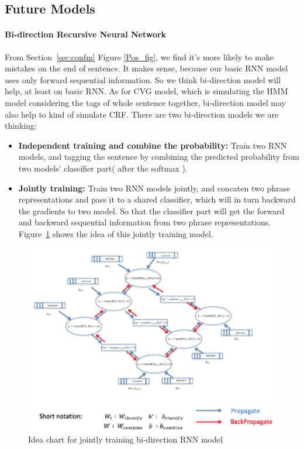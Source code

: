 \documentclass[11pt]{article}
\begin{document}
\subsection{Future Models}

\paragraph{Bi-direction Recursive Neural Network}
From Section~\ref{sec:confm} Figure \ref{Pos_fig}, we find it's more likely to make mistakes on the end of sentence. It makes sense, because our basic RNN model uses only forward sequential information. So we think bi-direction model will help, at least on basic RNN. As for CVG model, which is simulating the HMM model considering the tags of whole sentence together, bi-direction model may also help to kind of simulate CRF. There are two bi-direction models we are thinking:
\begin{itemize}
\item \textbf{Independent training and combine the probability: } Train two RNN models, and tagging the sentence by combining the predicted probability from two models' classifier part( after the softmax ). 
\item \textbf{Jointly training: } Train two RNN models jointly, and concaten two phrase representations and pass it to a shared classifier, which will in turn backward the gradients to two model. So that the classifier part will get the forward and backward sequential information from two phrase representations. Figure~\ref{fig:bi-direc} shows the idea of this jointly training model.
\end{itemize}
\begin{figure}
\includegraphics[scale=0.5]{bi_direct.png}
\caption{Idea chart for jointly training bi-direction RNN model}\label{fig:bi-direc}
\end{figure}
\end{document}

